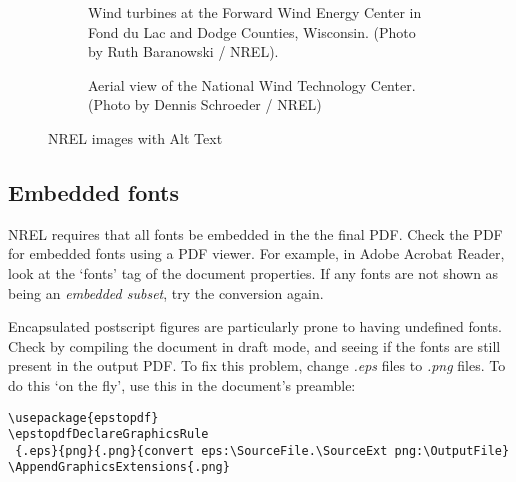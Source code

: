 \begin{figure*}
          \begin{subfigure}[b]{.55\linewidth}
            \centering
		{}
            \caption{Wind turbines at the Forward Wind Energy Center in Fond du Lac and Dodge Counties, Wisconsin. (Photo by Ruth Baranowski / NREL).}\label{fig:21206WithAltText}
          \end{subfigure}%
          \begin{subfigure}[b]{.55\linewidth}
            \centering
		{}
            \caption{Aerial view of the National Wind Technology Center. (Photo by Dennis Schroeder / NREL)}\label{fig:20018WithAltText2}
          \end{subfigure}
          \caption{NREL images with Alt Text}\label{fig:NRELimagesWithAltText}
\end{figure*}

\subsection{Embedded fonts}
NREL requires that all fonts be embedded in the the final PDF. Check the PDF for embedded fonts using a PDF viewer. For example, in Adobe Acrobat Reader, look at the `fonts' tag of the document properties. If any fonts are not shown as being an \emph{embedded subset}, try the conversion again. 

Encapsulated postscript figures are particularly prone to having undefined fonts. Check by compiling the document in draft mode, and seeing if the fonts are still present in the output PDF. To fix this problem, change \emph{.eps} files to \emph{.png} files. To do this `on the fly', use this in the document's preamble:

\begin{lstlisting}
\usepackage{epstopdf}
\epstopdfDeclareGraphicsRule
 {.eps}{png}{.png}{convert eps:\SourceFile.\SourceExt png:\OutputFile}
\AppendGraphicsExtensions{.png}
\end{lstlisting}